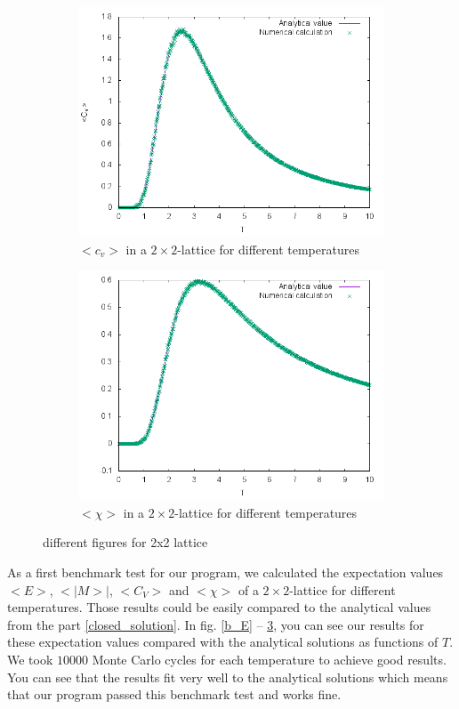 \documentclass[10pt,a4paper]{article}
\begin{document}
\begin{figure}[h]
\begin{subfigure}{0.45\textwidth}
	\includegraphics[width=\textwidth]{Heat_capacity.png}
	\caption{$<c_v>$ in a $2\times 2$-lattice for different temperatures\label{b_Cv}}
\end{subfigure}
\begin{subfigure}{0.45\textwidth}
\centering
	\includegraphics[width=\textwidth]{Susceptibility.png}
	\caption{$<\chi>$ in a $2\times 2$-lattice for different temperatures\label{b_chi}}
\end{subfigure}
\caption{different figures for 2x2 lattice}
\end{figure}
As a first benchmark test for our program, we calculated the expectation values $<E>$, $<|M>|$, $<C_V>$ and $<\chi>$ of a $2\times2$-lattice for different temperatures. Those results could be easily compared to the analytical values from the part \ref{closed_solution}. In fig. \ref{b_E} -- \ref{b_chi}, you can see our results for these expectation values compared with the analytical solutions as functions of $T$. We took $10000$ Monte Carlo cycles for each temperature to achieve good results. You can see that the results fit very well to the analytical solutions which means that our program passed this benchmark test and works fine.
\end{document}
